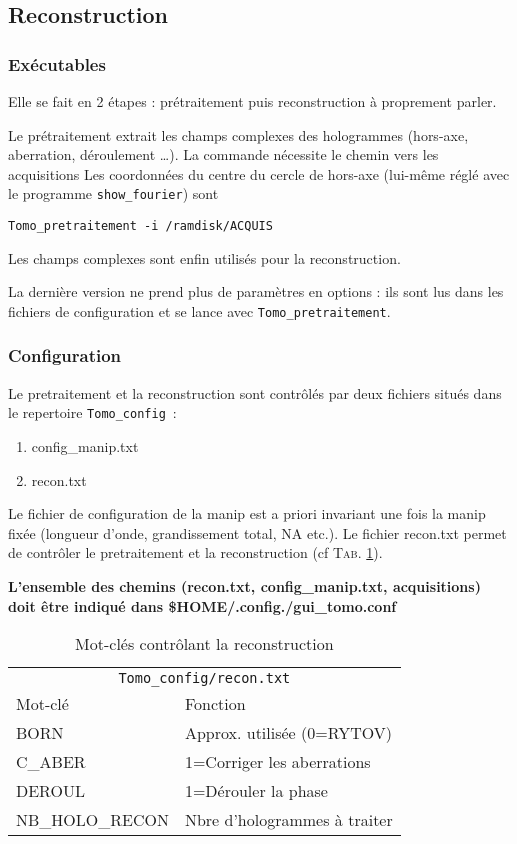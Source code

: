 \documentclass[	french,DIV=calc,%
							paper=a4,%
							fontsize=11pt,%
							twocolumn]{scrartcl}	 					%
\newcommand{\code}[1]{\texttt{#1}}
\begin{document}
\subsection{Reconstruction}
\subsubsection{Exécutables}
Elle se fait en 2 étapes : prétraitement puis reconstruction à proprement parler. 

Le prétraitement  extrait les champs complexes  des hologrammes (hors-axe, aberration, déroulement \ldots). La commande nécessite le chemin vers les acquisitions 
Les coordonnées du centre du cercle de hors-axe (lui-même réglé avec le programme \texttt{show\_fourier}) sont 

    \begin{center}
    \texttt{Tomo\_pretraitement -i /ramdisk/ACQUIS}
    \end{center}

Les champs complexes sont enfin utilisés pour la reconstruction.


La dernière version ne prend
plus de paramètres en options : ils sont lus dans les fichiers de configuration et se lance avec \code{Tomo\_pretraitement}.


\subsubsection{Configuration}
Le pretraitement et la reconstruction sont contrôlés par deux fichiers situés dans le repertoire \code{Tomo\_config}~:
\begin{enumerate}
 \item config\_manip.txt
 \item recon.txt
\end{enumerate}

Le fichier de configuration de la manip est a priori invariant une fois la manip fixée (longueur d'onde, grandissement total, NA etc.).
Le fichier recon.txt permet de contrôler le pretraitement et la reconstruction (cf \textsc{Tab.} \ref{recon_tab}). 

\textbf{
L'ensemble des chemins (recon.txt, config\_manip.txt, acquisitions) doit être indiqué dans \$HOME/.config./gui\_tomo.conf}


\begin{table}[h!]
\caption{Mot-clés contrôlant la reconstruction}
\centering
	\begin{tabular}{ll}
		\toprule
		\multicolumn{2}{c}{\code{Tomo\_config/recon.txt}} \\
		\cmidrule(r){1-2}
			Mot-clé 	& Fonction  \\
		\midrule
			BORN 		&  Approx. utilisée (0=RYTOV) \\
			C\_ABER  	& 1=Corriger les aberrations  \\
			DEROUL		& 1=Dérouler la phase\\
			NB\_HOLO\_RECON	& Nbre d'hologrammes à traiter\\
		\bottomrule
	\end{tabular}\label{recon_tab}
\end{table}
\end{document}
